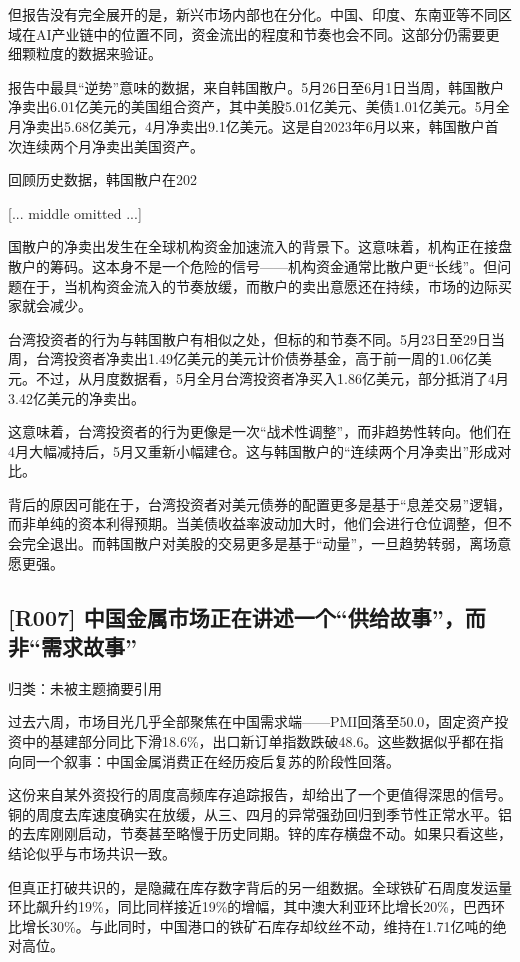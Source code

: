 \documentclass[11pt]{ctexart}
\begin{document}
但报告没有完全展开的是，新兴市场内部也在分化。中国、印度、东南亚等不同区域在AI产业链中的位置不同，资金流出的程度和节奏也会不同。这部分仍需要更细颗粒度的数据来验证。

报告中最具“逆势”意味的数据，来自韩国散户。5月26日至6月1日当周，韩国散户净卖出6.01亿美元的美国组合资产，其中美股5.01亿美元、美债1.01亿美元。5月全月净卖出5.68亿美元，4月净卖出9.1亿美元。这是自2023年6月以来，韩国散户首次连续两个月净卖出美国资产。

回顾历史数据，韩国散户在202

[... middle omitted ...]

国散户的净卖出发生在全球机构资金加速流入的背景下。这意味着，机构正在接盘散户的筹码。这本身不是一个危险的信号——机构资金通常比散户更“长线”。但问题在于，当机构资金流入的节奏放缓，而散户的卖出意愿还在持续，市场的边际买家就会减少。

台湾投资者的行为与韩国散户有相似之处，但标的和节奏不同。5月23日至29日当周，台湾投资者净卖出1.49亿美元的美元计价债券基金，高于前一周的1.06亿美元。不过，从月度数据看，5月全月台湾投资者净买入1.86亿美元，部分抵消了4月3.42亿美元的净卖出。

这意味着，台湾投资者的行为更像是一次“战术性调整”，而非趋势性转向。他们在4月大幅减持后，5月又重新小幅建仓。这与韩国散户的“连续两个月净卖出”形成对比。

背后的原因可能在于，台湾投资者对美元债券的配置更多是基于“息差交易”逻辑，而非单纯的资本利得预期。当美债收益率波动加大时，他们会进行仓位调整，但不会完全退出。而韩国散户对美股的交易更多是基于“动量”，一旦趋势转弱，离场意愿更强。

\subsection{[R007] 中国金属市场正在讲述一个“供给故事”，而非“需求故事”}
{\small\color{refgray}归类：未被主题摘要引用}

过去六周，市场目光几乎全部聚焦在中国需求端——PMI回落至50.0，固定资产投资中的基建部分同比下滑18.6\%，出口新订单指数跌破48.6。这些数据似乎都在指向同一个叙事：中国金属消费正在经历疫后复苏的阶段性回落。

这份来自某外资投行的周度高频库存追踪报告，却给出了一个更值得深思的信号。铜的周度去库速度确实在放缓，从三、四月的异常强劲回归到季节性正常水平。铝的去库刚刚启动，节奏甚至略慢于历史同期。锌的库存横盘不动。如果只看这些，结论似乎与市场共识一致。

但真正打破共识的，是隐藏在库存数字背后的另一组数据。全球铁矿石周度发运量环比飙升约19\%，同比同样接近19\%的增幅，其中澳大利亚环比增长20\%，巴西环比增长30\%。与此同时，中国港口的铁矿石库存却纹丝不动，维持在1.71亿吨的绝对高位。
\end{document}
